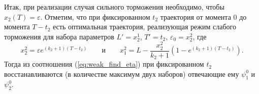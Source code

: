 Итак, при реализации случая сильного торможения необходимо, чтобы $x_2(T) = \varepsilon$. Отметим, что при фиксированном $t_2$ траектория от момента $0$ до момента $T-t_2$ есть оптимальная траектория, реализующая режим слабого торможения для набора параметров $L' = x_2^1$, $T' = t_2$, $\varepsilon_0 = x_2^2$, где
$$
        x_2^2 = \varepsilon e^{(k_2+1)(T-t_2)} \qquad \mbox{и} \qquad x_1^2=L - \frac{x_2^2}{k_2+1}\left(1-e^{(k_2+1)(T-t_2)}\right).
$$
Тогда из соотношения (\ref{eq:weak_find_eta}) при фиксированном $t_2$ восстанавливаются (в количестве максимум двух наборов) отвечающие ему $\psi_1^0$ и $\psi_2^0$.